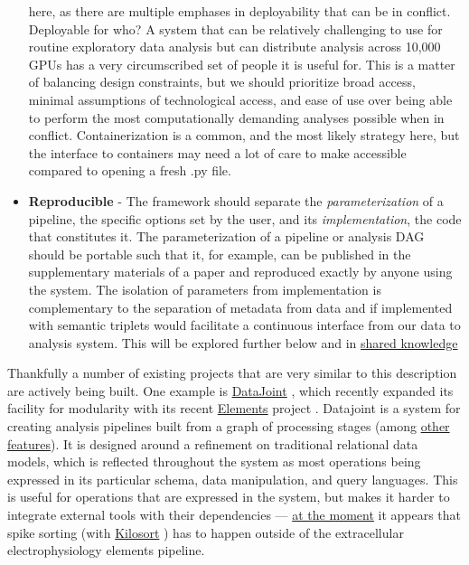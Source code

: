 \documentclass[10pt]{tufte-book}
\begin{document}
\begin{itemize}
  here, as there are multiple emphases in deployability that can be in
  conflict. Deployable for who? A system that can be relatively
  challenging to use for routine exploratory data analysis but can
  distribute analysis across 10,000 GPUs has a very circumscribed set of
  people it is useful for. This is a matter of balancing design
  constraints, but we should prioritize broad access, minimal
  assumptions of technological access, and ease of use over being able
  to perform the most computationally demanding analyses possible when
  in conflict. Containerization is a common, and the most likely
  strategy here, but the interface to containers may need a lot of care
  to make accessible compared to opening a fresh .py file.
\item
  \textbf{Reproducible} - The framework should separate the
  \emph{parameterization} of a pipeline, the specific options set by the
  user, and its \emph{implementation}, the code that constitutes it. The
  parameterization of a pipeline or analysis DAG should be portable such
  that it, for example, can be published in the supplementary materials
  of a paper and reproduced exactly by anyone using the system. The
  isolation of parameters from implementation is complementary to the
  separation of metadata from data and if implemented with semantic
  triplets would facilitate a continuous interface from our data to
  analysis system. This will be explored further below and in
  \protect\hyperlink{shared-knowledge}{shared knowledge}
\end{itemize}

Thankfully a number of existing projects that are very similar to this
description are actively being built. One example is
\href{https://datajoint.io/}{DataJoint} \citep{yatsenkoDataJointSimplerRelational2018} , which recently expanded its
facility for modularity with its recent
\href{https://github.com/datajoint/datajoint-elements}{Elements} project
\citep{yatsenkoDataJointElementsData2021} . Datajoint is a system
for creating analysis pipelines built from a graph of processing stages
(among
\href{https://docs.datajoint.org/python/v0.13/intro/01-Data-Pipelines.html\#what-is-datajoint}{other
features}). It is designed around a refinement on traditional relational
data models, which is reflected throughout the system as most operations
being expressed in its particular schema, data manipulation, and query
languages. This is useful for operations that are expressed in the
system, but makes it harder to integrate external tools with their
dependencies ---
\href{https://github.com/datajoint/element-array-ephys/blob/1fdbcf12d1a518e686b6b79e9fbe77b736cb606a/Background.md}{at
the moment} it appears that spike sorting (with
\href{https://github.com/MouseLand/Kilosort}{Kilosort} \citep{pachitariuKilosortRealtimeSpikesorting2016} ) has to happen outside
of the extracellular electrophysiology elements pipeline.
\end{document}
